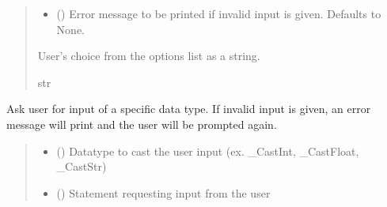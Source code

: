 \documentclass[letterpaper,10pt,english]{sphinxmanual}
\begin{document}
\begin{fulllineitems}
\begin{fulllineitems}
\begin{quote}
\begin{description}
\begin{itemize}
\item {} 
\sphinxAtStartPar
{} (\sphinxstyleliteralemphasis{\sphinxupquote{ | }}\sphinxstyleliteralemphasis{\sphinxupquote{, }}) \textendash{} Error message to be printed if invalid input is given.                 Defaults to None.

\end{itemize}

\sphinxAtStartPar
User’s choice from the options list as a string.

\sphinxAtStartPar
str

\end{description}\end{quote}

\end{fulllineitems}


\begin{fulllineitems}
\label{\detokenize{Setup.Inputs:Setup.Inputs.GetUserInput.UserInput.AskForType}}
\pysigstartsignatures
{}
\pysigstopsignatures
\sphinxAtStartPar
Ask user for input of a specific data type. If invalid input is given, an error message will         print and the user will be prompted again.
\begin{quote}\begin{description}
\begin{itemize}
\item {} 
\sphinxAtStartPar
{} () \textendash{} Datatype to cast the user input (ex. \_CastInt, \_CastFloat, \_CastStr)

\item {} 
\sphinxAtStartPar
{} () \textendash{} Statement requesting input from the user


\end{itemize}
\end{description}
\end{quote}
\end{fulllineitems}
\end{fulllineitems}
\end{document}
